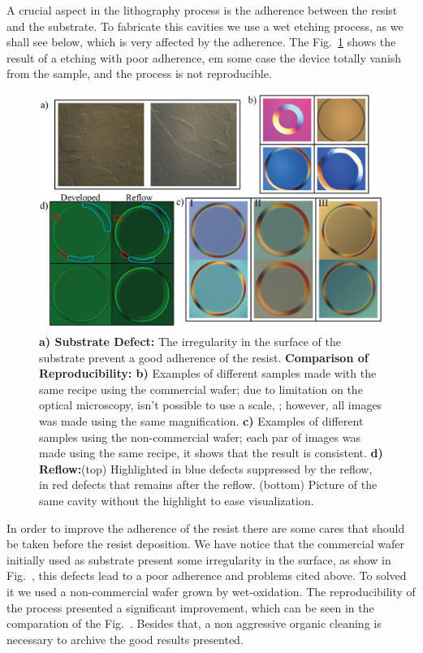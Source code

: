 A crucial aspect in the lithography process is the adherence between the resist and the substrate. To fabricate this cavities we use a wet etching process, as we shall see below, which is very affected by the adherence. The Fig.~\ref{fig:adhrence_problem} 
shows the result of a etching with poor adherence, em some case the device totally vanish from the sample, and the process is not reproducible.
\begin{figure}[!hbt]
    \centering
    \includegraphics[width = 16cm]{figuras/Dissertation_etching_result.jpg}
    \caption{\textbf{a) Substrate Defect:} The irregularity in the surface of the substrate prevent a good adherence of the resist. \textbf{Comparison of Reproducibility: b)} Examples of different samples made with the same recipe using the commercial wafer; due to limitation on the optical microscopy, isn't possible to use a scale, ; however, all images was made using the same magnification. \textbf{c)} Examples of different samples using the non-commercial wafer; each par of images was made using the same recipe, it shows that the result is consistent. \textbf{d) Reflow:}(top) Highlighted in blue defects suppressed by the reflow, in red defects that remains after the reflow. (bottom) Picture of the same cavity without the highlight to ease visualization.}
    \label{fig:adhrence_problem}
\end{figure}

In order to improve the adherence of the resist there are some cares that should be taken before the resist deposition. We have notice that the commercial wafer initially used as substrate present some irregularity in the surface, as show in Fig.~, this defects lead to a poor adherence and problems cited above. To solved it we used a non-commercial wafer grown by wet-oxidation. The reproducibility of the process presented a significant improvement, which can be seen in the comparation of the Fig.~. Besides that, a non aggressive organic cleaning is necessary to archive the good results presented.

